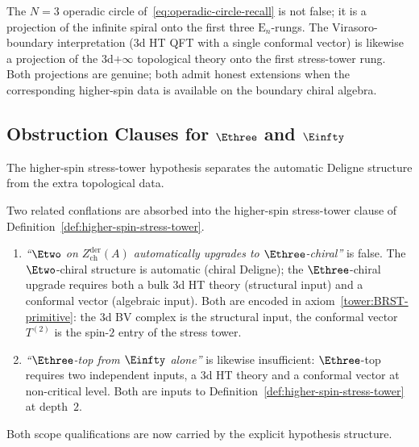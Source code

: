 \begin{remark}
\label{rem:spiral-vs-circle}
The $N = 3$ operadic circle of~\eqref{eq:operadic-circle-recall} is not
false; it is a projection of the infinite spiral onto the first three
$\mathrm{E}_n$-rungs. The Virasoro-boundary interpretation (3d HT QFT
with a single conformal vector) is likewise a
projection of the $3$d$+\infty$ topological theory onto the first
stress-tower rung. Both projections are genuine; both admit honest
extensions when the corresponding higher-spin data is available on the
boundary chiral algebra.
\end{remark}

\subsection{Obstruction Clauses for \texorpdfstring{$\Ethree$}{E3} and \texorpdfstring{$\Einfty$}{E-infinity}}
\label{subsec:e-infinity-fm-healing}

The higher-spin stress-tower hypothesis separates the automatic
Deligne structure from the extra topological data.

\begin{proposition}
\label{prop:scope-E2-to-E3}
Two related conflations are absorbed into the higher-spin stress-tower
clause of Definition~\ref{def:higher-spin-stress-tower}.

\begin{enumerate}[label=\textup{(\arabic*)}]
\item \emph{``$\Etwo$ on $Z^{\mathrm{der}}_{\mathrm{ch}}(A)$
 automatically upgrades to $\Ethree$-chiral''} is false. The
 $\Etwo$-chiral structure is automatic (chiral Deligne); the $\Ethree$-chiral
 upgrade requires both a bulk $3$d HT theory (structural input) and a
 conformal vector (algebraic input). Both are encoded in
 axiom~\ref{tower:BRST-primitive}: the $3$d BV complex is the
 structural input, the conformal vector $T^{(2)}$ is the spin-$2$
 entry of the stress tower.
\item \emph{``$\Ethree$-top from $\Einfty$ alone''} is likewise
 insufficient: $\Ethree$-top requires two independent inputs,
 a 3d HT theory and a conformal vector at non-critical level. Both are
 inputs to Definition~\ref{def:higher-spin-stress-tower} at depth~$2$.
\end{enumerate}
Both scope qualifications are now carried by the explicit hypothesis
structure.
\end{proposition}

